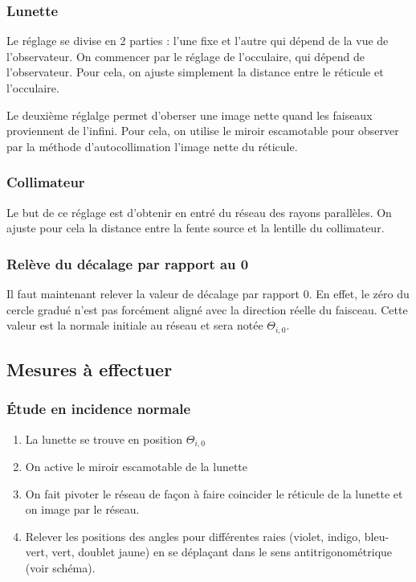 \documentclass[a4paper,10pt,french]{scrartcl}
\begin{document}
\subsubsection{Lunette}
Le réglage se divise en 2 parties : l'une fixe et l'autre qui dépend de la vue de l'observateur. On commencer par le réglage de l'occulaire, qui dépend de l'observateur. Pour cela, on ajuste simplement la distance entre le réticule et l'occulaire.

Le deuxième réglalge permet d'oberser une image nette quand les faiseaux proviennent de l'infini. Pour cela, on utilise le miroir escamotable pour observer par la méthode d'autocollimation l'image nette du réticule.
\subsubsection{Collimateur}
Le but de ce réglage est d'obtenir en entré du réseau des rayons parallèles. On ajuste pour cela la distance entre la fente source et la lentille du collimateur.
\subsubsection{Relève du décalage par rapport au 0}
Il faut maintenant relever la valeur de décalage par rapport 0. En effet, le zéro du cercle gradué n’est pas forcément aligné avec la direction réelle du faisceau. Cette valeur est la normale initiale au réseau et sera notée \(\Theta_{i,0}\).
\subsection{Mesures à effectuer}
\subsubsection{Étude en incidence normale}
\begin{enumerate}
 \item La lunette se trouve en position \(\Theta_{i,0}\)
 \item On active le miroir escamotable de la lunette
 \item On fait pivoter le réseau de façon à faire coincider le réticule de la lunette et on image par le réseau.
 \item Relever les positions des angles pour différentes raies (violet, indigo, bleu-vert, vert, doublet jaune) en se déplaçant dans le sens antitrigonométrique (voir schéma).
\end{enumerate}
\end{document}
